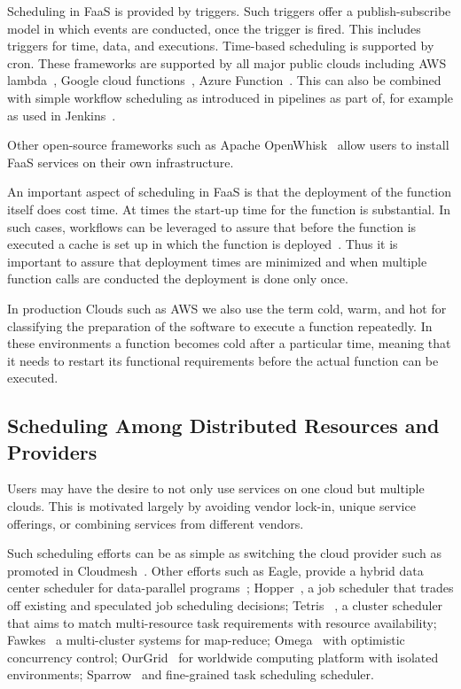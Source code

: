 \documentclass[final,5p,times,twocolumn]{elsarticle}
\begin{document}
Scheduling in FaaS is provided by triggers. Such triggers offer a publish-subscribe model in which events are conducted, once the trigger is fired. This includes triggers for time, data, and executions. Time-based scheduling is supported by cron. These frameworks are supported by all major public clouds including AWS lambda~\cite{AWSlambda2018}, Google cloud functions~\cite{GoogleCF2018}, Azure Function~\cite{Azure2018}. This can also be combined with simple workflow scheduling as introduced in pipelines as part of, for example as used in Jenkins~\cite{www-jenkins-pipeline}.

Other open-source frameworks such as Apache OpenWhisk~\cite{OpenWhisk2018} allow users to install FaaS services on their own infrastructure.

An important aspect of scheduling in FaaS is that the deployment of the function itself does cost time. At times the start-up time for the function is substantial. In such cases, workflows can be leveraged to assure that before the function is executed a cache is set up in which the function is deployed~\cite{faas-package-cache}. Thus it is important to assure that deployment times are minimized and when multiple function calls are conducted the deployment is done only once.

In production Clouds such as AWS we also use the term cold, warm, and hot for classifying 
the preparation of the software to execute a function repeatedly. In these environments a function becomes cold after a particular time, meaning that it needs to restart its functional requirements before the actual function can be executed.

\subsection{Scheduling Among Distributed Resources and Providers}
\label{sec:distributed}


Users may have the desire to not only use services on one cloud but multiple clouds. This is motivated largely by avoiding vendor lock-in, unique service offerings, or combining services from different vendors.

Such scheduling efforts can be as simple as switching the cloud provider such as promoted in Cloudmesh~\cite{von2014accessing}. Other efforts such as Eagle, provide a hybrid data center scheduler for data-parallel programs~\cite{delgado2016job}; Hopper~\cite{ren2015hopper}, a job scheduler that trades off existing and speculated job scheduling decisions; Tetris ~\cite{grandl2015multi}, a cluster scheduler that aims to match multi-resource task requirements with resource availability; Fawkes~\cite{ghit2014balanced} a multi-cluster systems for map-reduce; Omega~\cite{schwarzkopf2013omega} with optimistic concurrency control; OurGrid~\cite{andrade2003ourgrid,cirne2006labs} for worldwide computing platform with isolated environments; Sparrow~\cite{ousterhout2013sparrow} and fine-grained task scheduling scheduler.
 
\end{document}
